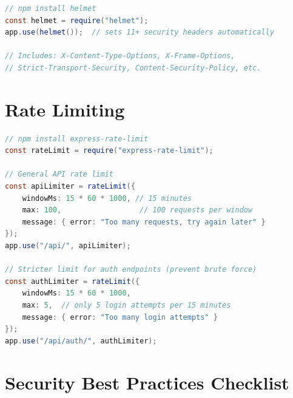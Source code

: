 \documentclass[12pt, a4paper, oneside]{book}
\begin{document}
\begin{lstlisting}[language=Java, caption={Security headers (Express with helmet)}]
// npm install helmet
const helmet = require("helmet");
app.use(helmet());  // sets 11+ security headers automatically

// Includes: X-Content-Type-Options, X-Frame-Options,
// Strict-Transport-Security, Content-Security-Policy, etc.
\end{lstlisting}

\section{Rate Limiting}

\begin{lstlisting}[language=Java, caption={Rate limiting in Express}]
// npm install express-rate-limit
const rateLimit = require("express-rate-limit");

// General API rate limit
const apiLimiter = rateLimit({
    windowMs: 15 * 60 * 1000, // 15 minutes
    max: 100,                  // 100 requests per window
    message: { error: "Too many requests, try again later" }
});
app.use("/api/", apiLimiter);

// Stricter limit for auth endpoints (prevent brute force)
const authLimiter = rateLimit({
    windowMs: 15 * 60 * 1000,
    max: 5,  // only 5 login attempts per 15 minutes
    message: { error: "Too many login attempts" }
});
app.use("/api/auth/", authLimiter);
\end{lstlisting}

\section{Security Best Practices Checklist}
\end{document}

